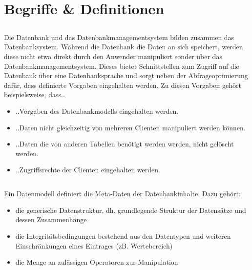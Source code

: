 
\newcommand{\dozent}{Prof. Dr. Agnès Voisard \\ Nicolas Lehmann}					%
\newcommand{\tutor}{Alexander Schulz}						%
\newcommand{\tutoriumNo}{04}				%
\newcommand{\ubungNo}{01}									%
\newcommand{\veranstaltung}{Datenbanksysteme}	%
\newcommand{\semester}{SoSe 18}						%
\newcommand{\studenten}{Mark Niehues}			%



\section{Begriffe \& Definitionen}
\subsection{}
Die Datenbank und das Datenbankmanagementsystem bilden zusammen das Datenbanksystem. Während die Datenbank die Daten an sich speichert, werden diese nicht etwa direkt durch den Anwender manipuliert sonder über das Datenbankmanagementsystem. Dieses bietet Schnittstellen zum Zugriff auf die Datenbank über eine Datenbanksprache und sorgt neben der Abfrageoptimierung dafür, dass definierte Vorgaben eingehalten werden. Zu diesen Vorgaben gehört beispielsweise, dass..
\begin{itemize}
\item ..Vorgaben des Datenbankmodells eingehalten werden.
\item ..Daten nicht gleichzeitig von mehreren Clienten manipuliert werden können.
\item ..Daten die von anderen Tabellen benötigt werden werden, nicht gelöscht werden.
\item ..Zugriffsrechte der Clienten eingehalten werden.
\end{itemize}

\subsection{}
Ein Datenmodell definiert die Meta-Daten der Datenbankinhalte. Dazu gehört:
\begin{itemize}
\item die generische Datenstruktur, dh. grundlegende Struktur der Datensätze und dessen Zusammenhänge
\item die Integritätsbedingungen bestehend aus den Datentypen und weiteren Einschränkungen eines Eintrages (zB. Wertebereich)
\item die Menge an zulässigen Operatoren zur Manipulation
\end{itemize}

